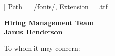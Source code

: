 


\renewcommand{\photo}[2]{}

\geometry{
  left=2cm,
  right=2cm,
  top=2cm,
  bottom=2cm
}



\makecvheader

\setmainfont{NotoSans-Regular}[
  Path = ./fonts/,
  Extension = .ttf
]

\vspace{1cm}
\indent\textbf{Hiring Management Team}\\
\indent\textbf{Janus Henderson}

\vspace{0.5cm}

\noindent To whom it may concern:

\vspace{0.5cm}


